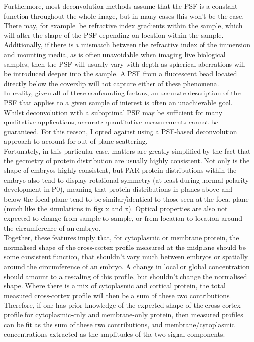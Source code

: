 \documentclass[12pt]{"article"}
\begin{document}
Furthermore, most deconvolution methods assume that the PSF is a constant function throughout the whole image, but in many cases this won't be the case. There may, for example, be refractive index gradients within the sample, which will alter the shape of the PSF depending on location within the sample. Additionally, if there is a mismatch between the refractive index of the immersion and mounting media, as is often unavoidable when imaging live biological samples, then the PSF will usually vary with depth as spherical aberrations will be introduced deeper into the sample. A PSF from a fluorescent bead located directly below the coverslip will not capture either of these phenomena.\\

In reality, given all of these confounding factors, an accurate description of the PSF that applies to a given sample of interest is often an unachievable goal. Whilst deconvolution with a suboptimal PSF may be sufficient for many qualitative applications, accurate quantitative measurements cannot be guaranteed. For this reason, I opted against using a PSF-based deconvolution approach to account for out-of-plane scattering.\\


Fortunately, in this particular case, matters are greatly simplified by the fact that the geometry of protein distribution are usually highly consistent. Not only is the shape of embryos highly consistent, but PAR protein distributions within the embryo also tend to display rotational symmetry (at least during normal polarity development in P0), meaning that protein distributions in planes above and below the focal plane tend to be similar/identical to those seen at the focal plane (much like the simulations in figs x and x). Optical properties are also not expected to change from sample to sample, or from location to location around the circumference of an embryo.\\

Together, these features imply that, for cytoplasmic or membrane protein, the normalised shape of the cross-cortex profile measured at the midplane should be some consistent function, that shouldn’t vary much between embryos or spatially around the circumference of an embryo. A change in local or global concentration should amount to a rescaling of this profile, but shouldn't change the normalised shape. Where there is a mix of cytoplasmic and cortical protein, the total measured cross-cortex profile will then be a sum of these two contributions. Therefore, if one has prior knowledge of the expected shape of the cross-cortex profile for cytoplasmic-only and membrane-only protein, then measured profiles can be fit as the sum of these two contributions, and membrane/cytoplasmic concentrations extracted as the amplitudes of the two signal components.\\
\end{document}

